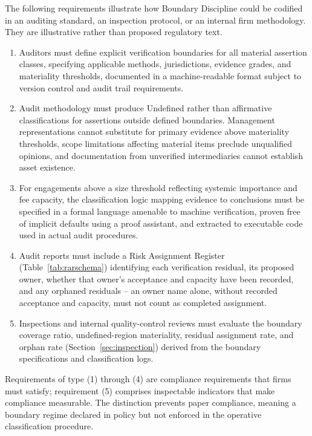 \documentclass[11pt,a4paper]{article}
\theoremstyle{definition}
\theoremstyle{remark}
\begin{document}
The following requirements illustrate how Boundary Discipline could be codified in an auditing standard, an inspection protocol, or an internal firm methodology. They are illustrative rather than proposed regulatory text.

\begin{enumerate}
\item Auditors must define explicit verification boundaries for all material assertion classes, specifying applicable methods, jurisdictions, evidence grades, and materiality thresholds, documented in a machine-readable format subject to version control and audit trail requirements.
\item Audit methodology must produce \textsf{Undefined} rather than affirmative classifications for assertions outside defined boundaries. Management representations cannot substitute for primary evidence above materiality thresholds, scope limitations affecting material items preclude unqualified opinions, and documentation from unverified intermediaries cannot establish asset existence.
\item For engagements above a size threshold reflecting systemic importance and fee capacity, the classification logic mapping evidence to conclusions must be specified in a formal language amenable to machine verification, proven free of implicit defaults using a proof assistant, and extracted to executable code used in actual audit procedures.
\item Audit reports must include a Risk Assignment Register (Table~\ref{tab:rarschema}) identifying each verification residual, its proposed owner, whether that owner's acceptance and capacity have been recorded, and any orphaned residuals -- an owner name alone, without recorded acceptance and capacity, must not count as completed assignment.
\item Inspections and internal quality-control reviews must evaluate the boundary coverage ratio, undefined-region materiality, residual assignment rate, and orphan rate (Section~\ref{sec:inspection}) derived from the boundary specifications and classification logs.
\end{enumerate}

Requirements of type (1) through (4) are compliance requirements that firms must satisfy; requirement (5) comprises inspectable indicators that make compliance measurable. The distinction prevents paper compliance, meaning a boundary regime declared in policy but not enforced in the operative classification procedure.
\end{document}
